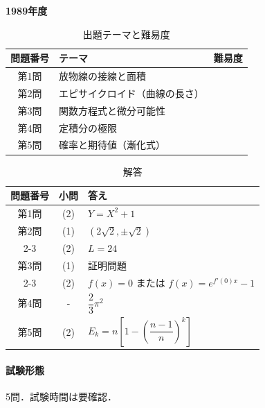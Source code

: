 \documentclass[../../main.tex]{subfiles}
\begin{document}
\begin{center}
  {\fontsize{48pt}{58pt}\selectfont \textbf{1989}\normalsize\textbf{年度}}
\end{center}

\begin{table}[htb]
  \centering
  \caption{出題テーマと難易度}
  \begin{tabular}{|c|p{9cm}|c|}
    \hline
    \textbf{問題番号} & \textbf{テーマ} & \textbf{難易度} \\
    \hline
    第1問 & 放物線の接線と面積 & \\
    \hline
    第2問 & エピサイクロイド（曲線の長さ） & \\
    \hline
    第3問 & 関数方程式と微分可能性 & \\
    \hline
    第4問 & 定積分の極限 & \\
    \hline
    第5問 & 確率と期待値（漸化式） & \\
    \hline
  \end{tabular}
\end{table}

\begin{table}[htb]
  \centering
  \caption{解答}
  \renewcommand{\arraystretch}{1.4}
  \begin{tabular}{|c|c|p{9cm}|}
    \hline
    \textbf{問題番号} & \textbf{小問} & \textbf{答え} \\
    \hline
    第1問 & (2) & $Y=X^2+1$ \\
    \hline
    第2問 & (1) & $(2\sqrt{2},\pm\sqrt{2})$ \\
    \cline{2-3}
    & (2) & $L=24$ \\
    \hline
    第3問 & (1) & 証明問題 \\
    \cline{2-3}
    & (2) & $f(x)=0$ または $f(x)=e^{f'(0)x}-1$ \\
    \hline
    第4問 & - & $\dfrac{2}{3}\pi^2$ \\
    \hline
    第5問 & (2) & $E_k=n\left[1-\left(\dfrac{n-1}{n}\right)^k\right]$ \\
    \hline
  \end{tabular}
\end{table}

\paragraph{試験形態}
5問．試験時間は要確認．
\end{document}
